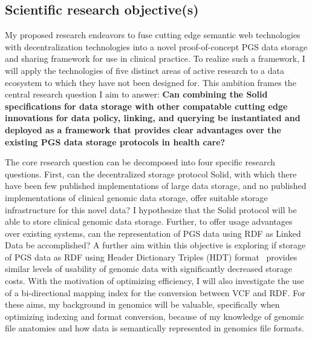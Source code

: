 \documentclass[a4paper,11pt]{article}
\begin{document}
\begin{refsection}
\section{Scientific research objective(s)}

\begin{comment}
Describe explicitly the scientific objective(s) and the research hypothesis. 
Explain whether and how the research is specifically challenging and inventive, describing in particular the innovative aspects of the envisaged results. 
Discuss in detail the results (or partial results) that you aim to achieve, such as specific knowledge, the solution to particular problems and academic breakthroughs.
\end{comment}
\smallskip

\noindent
My proposed research endeavors to fuse cutting edge semantic web technologies with decentralization technologies into a novel proof-of-concept PGS data storage and sharing framework for use in clinical practice. 
To realize such a framework, I will apply the technologies of five distinct areas of active research to a data ecosystem to which they have not been designed for.
This ambition frames the central research question I aim to answer: \textbf{Can combining the Solid specifications for data storage with other compatable cutting edge innovations for data policy, linking, and querying be instantiated and deployed as a framework that provides clear advantages over the existing PGS data storage protocols in health care?}

The core research question can be decomposed into four specific research questions.
First, can the decentralized storage protocol Solid, with which there have been few published implementations of large data storage, %
and no published implementations of clinical genomic data storage, offer suitable storage infrastructure for this novel data? 
I hypothesize that the Solid protocol will be able to store clinical genomic data storage.
Further, to offer usage advantages over existing systems, can the representation of PGS data using RDF as Linked Data be accomplished? 
A further aim within this objective is exploring if storage of PGS data as RDF using Header Dictionary Triples (HDT) format~\cite{spec:hdt} provides similar levels of usability of genomic data with significantly decreased storage costs.
With the motivation of optimizing efficiency, I will also investigate the use of a bi-directional mapping index for the conversion between VCF and RDF.
For these aims, my background in genomics will be valuable, specifically when optimizing indexing and format conversion, because of my knowledge of genomic file anatomies and how data is semantically represented in genomics file formats.


\end{refsection}
\end{document}
